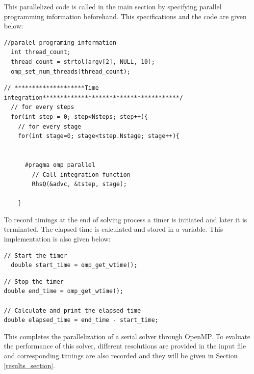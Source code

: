\documentclass{article}
\begin{document}
This parallelized code is called in the main section by specifying parallel programming information beforehand. This specifications and the code are given below: 
\begin{verbatim}
//paralel programing information
  int thread_count;
  thread_count = strtol(argv[2], NULL, 10);
  omp_set_num_threads(thread_count);
\end{verbatim}

\begin{verbatim}
// ********************Time integration***************************************/
  // for every steps
  for(int step = 0; step<Nsteps; step++){
    // for every stage
    for(int stage=0; stage<tstep.Nstage; stage++){


      #pragma omp parallel 
        // Call integration function
        RhsQ(&advc, &tstep, stage); 
  
    }
\end{verbatim}

To record timings at the end of solving process a timer is initiated and later it is terminated. The elapsed time is calculated and stored in a variable. This implementation is also given below: 

\begin{verbatim}
// Start the timer
  double start_time = omp_get_wtime();
\end{verbatim}

\begin{verbatim}
// Stop the timer
double end_time = omp_get_wtime();

// Calculate and print the elapsed time
double elapsed_time = end_time - start_time;
\end{verbatim}

This completes the parallelization of a serial solver through OpenMP. To evaluate the performance of this solver, different resolutions are provided in the input file and corresponding timings are also recorded and they will be given in Section \ref{results_section}. 
\clearpage
\end{document}
